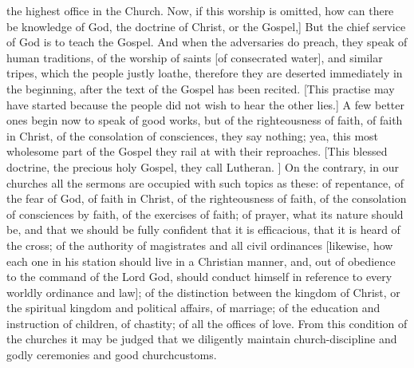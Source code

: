 the highest office in the Church.  Now, if this worship is omitted,
how can there be knowledge of God, the doctrine of Christ, or the
Gospel,] But the chief service of God is to teach the Gospel.  And
when the adversaries do preach, they speak of human traditions, of
the worship of saints [of consecrated water], and similar tripes,
which the people justly loathe, therefore they are deserted
immediately in the beginning, after the text of the Gospel has been
recited.  [This practise may have started because the people did not
wish to hear the other lies.] A few better ones begin now to speak of
good works, but of the righteousness of faith, of faith in Christ, of
the consolation of consciences, they say nothing; yea, this most
wholesome part of the Gospel they rail at with their reproaches.
[This blessed doctrine, the precious holy Gospel, they call Lutheran.
] On the contrary, in our churches all the sermons are occupied with
such topics as these: of repentance, of the fear of God, of faith in
Christ, of the righteousness of faith, of the consolation of
consciences by faith, of the exercises of faith; of prayer, what its
nature should be, and that we should be fully confident that it is
efficacious, that it is heard of the cross; of the authority of
magistrates and all civil ordinances [likewise, how each one in his
station should live in a Christian manner, and, out of obedience to
the command of the Lord God, should conduct himself in reference to
every worldly ordinance and law]; of the distinction between the
kingdom of Christ, or the spiritual kingdom and political affairs, of
marriage; of the education and instruction of children, of chastity;
of all the offices of love.  From this condition of the churches it
may be judged that we diligently maintain church-discipline and godly
ceremonies and good churchcustoms.

